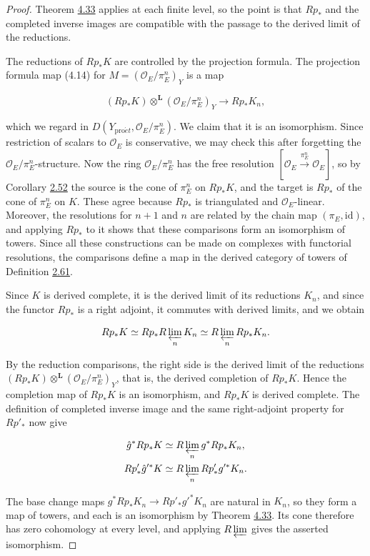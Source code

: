 \documentclass[11pt]{article}
\begin{document}
\begin{proof}[{Proof}]\label{bp398}%
Theorem \hyperref[bp382]{4.33} applies at each finite level, so the point is that \(Rp_*\) and the completed inverse images are compatible with the passage to the derived limit of the reductions.

The reductions of \(Rp_*K\) are controlled by the projection formula. The projection formula map (4.14) for \(M=(\mathcal O_E/\pi_E^n)_Y\) is a map

\[
(Rp_*K)\otimes^{\mathbf L}(\mathcal O_E/\pi_E^n)_Y
\longrightarrow Rp_*K_n,
\]

which we regard in \(D(Y_{\mathrm{pro}\acute{e}t},\mathcal O_E/\pi_E^n)\). We claim that it is an isomorphism. Since restriction of scalars to \(\mathcal O_E\) is conservative, we may check this after forgetting the \(\mathcal O_E/\pi_E^n\)-structure. Now the ring \(\mathcal O_E/\pi_E^n\) has the free resolution \([\mathcal O_E\xrightarrow{\pi_E^n}\mathcal O_E]\), so by Corollary \hyperref[bp161]{2.52} the source is the cone of \(\pi_E^n\) on \(Rp_*K\), and the target is \(Rp_*\) of the cone of \(\pi_E^n\) on \(K\). These agree because \(Rp_*\) is triangulated and \(\mathcal O_E\)-linear. Moreover, the resolutions for \(n+1\) and \(n\) are related by the chain map \((\pi_E,\mathrm{id})\), and applying \(Rp_*\) to it shows that these comparisons form an isomorphism of towers. Since all these constructions can be made on complexes with functorial resolutions, the comparisons define a map in the derived category of towers of Definition \hyperref[bp188]{2.61}.

Since \(K\) is derived complete, it is the derived limit of its reductions \(K_n\), and since the functor \(Rp_*\) is a right adjoint, it commutes with derived limits, and we obtain

\[
Rp_*K\simeq Rp_*R\varprojlim_nK_n
\simeq R\varprojlim_nRp_*K_n.
\]

By the reduction comparisons, the right side is the derived limit of the reductions \((Rp_*K)\otimes^{\mathbf L}(\mathcal O_E/\pi_E^n)_Y\), that is, the derived completion of \(Rp_*K\). Hence the completion map of \(Rp_*K\) is an isomorphism, and \(Rp_*K\) is derived complete. The definition of completed inverse image and the same right-adjoint property for \(Rp'_*\) now give

\[
\begin{aligned}
\hat g^*Rp_*K
&\simeq R\varprojlim_n g^*Rp_*K_n,\\
Rp'_*\hat g'^*K
&\simeq R\varprojlim_n Rp'_*g'^*K_n.
\end{aligned}
\]

The base change maps \(g^*Rp_*K_n\to Rp'_*g'^*K_n\) are natural in \(K_n\), so they form a map of towers, and each is an isomorphism by Theorem \hyperref[bp382]{4.33}. Its cone therefore has zero cohomology at every level, and applying \(R\varprojlim\) gives the asserted isomorphism.
\end{proof}
\end{document}
